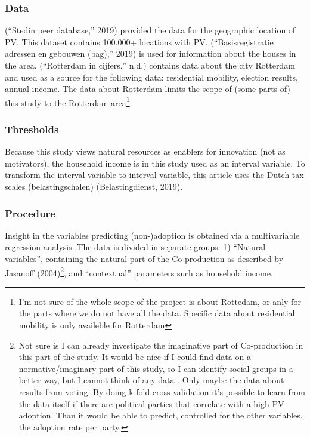 \documentclass[man,floatsintext]{apa6}
\let\rmarkdownfootnote\footnote%
\def\footnote{\protect\rmarkdownfootnote}
\begin{document}
\subsubsection{Data}\label{data}

(``Stedin peer database,'' 2019) provided the data for the geographic
location of PV. This dataset contains 100.000+ locations with PV.
(``Basisregistratie adressen en gebouwen (bag),'' 2019) is used for
information about the houses in the area. (``Rotterdam in cijfers,''
n.d.) contains data about the city Rotterdam and used as a source for
the following data: residential mobility, election results, annual
income. The data about Rotterdam limits the scope of (some parts of)
this study to the Rotterdam area\footnote{I'm not sure of the whole
  scope of the project is about Rottedam, or anly for the parts where we
  do not have all the data. Specific data about residential mobility is
  only availeble for Rotterdam}.

\subsubsection{Thresholds}\label{thresholds}

Because this study views natural resources as enablers for innovation
(not as motivators), the household income is in this study used as an
interval variable. To transform the interval variable to interval
variable, this article uses the Dutch tax scales (belastingschalen)
(Belastingdienst, 2019).

\subsubsection{Procedure}\label{procedure}

Insight in the variables predicting (non-)adoption is obtained via a
multivariable regression analysis. The data is divided in separate
groups: 1) \enquote{Natural variables}, containing the natural part of
the Co-production as described by Jasanoff (2004)\footnote{Not sure is I
  can already investigate the imaginative part of Co-production in this
  part of the study. It would be nice if I could find data on a
  normative/imaginary part of this study, so I can identify social
  groups in a better way, but I cannot think of any data . Only maybe
  the data about results from voting. By doing k-fold cross validation
  it's possible to learn from the data itself if there are political
  parties that correlate with a high PV-adoption. Than it would be able
  to predict, controlled for the other variables, the adoption rate per
  party.}, and \enquote{contextual} parameters such as household income.
\end{document}
